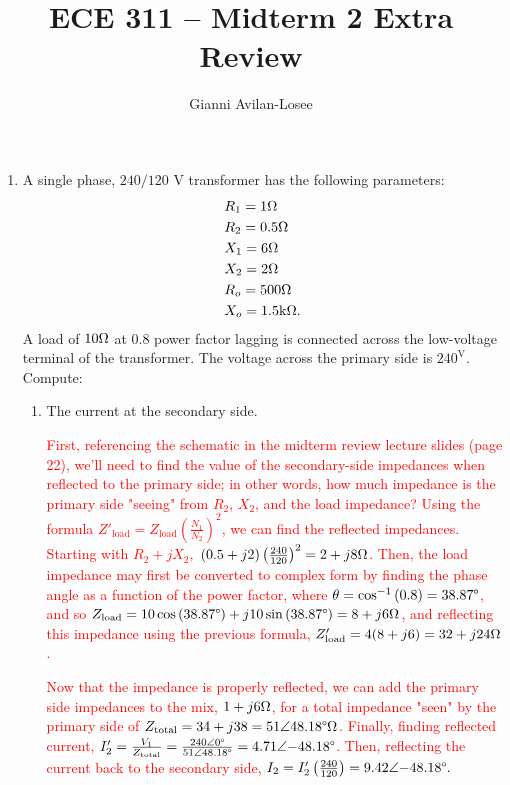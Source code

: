 \documentclass{article}
\title{ECE 311 -- Midterm 2 Extra Review}
\author{Gianni Avilan-Losee}
\begin{document}
\begin{enumerate}[label=\thesubsection]
	\setcounter{section}{11}
	\setcounter{subsection}{1}
	\item A single phase, \(240/120\) V transformer has the following parameters:
		\begin{align*}
		 &R_1 = 1\ohm \\
		 &R_2 = 0.5\ohm \\
		 &X_1 = 6\ohm \\
		 &X_2 = 2\ohm \\
		 &R_o = 500\ohm \\
		 &X_o = 1.5 \mathrm{k}\ohm.
		\end{align*}
		A load of \(10\ohm\) at 0.8 power factor lagging is connected across the low-voltage terminal of the transformer. The voltage across the primary side is \(240^{\mathrm{V}}\). Compute:
		\begin{enumerate}[label=\alph*)]
			\item The current at the secondary side.

				\textcolor{red}{First, referencing the schematic in the midterm review lecture slides (page 22), we'll need to find the value of the secondary-side impedances when reflected to the primary side; in other words, how much impedance is the primary side "seeing" from \(R_2\), \(X_2\), and the load impedance? Using the formula \(Z'_{\mathrm{load}} = Z_{\mathrm{load}}\left(\frac{N_1}{N_2}\right)^2\), we can find the reflected impedances. Starting with \(R_2 + jX_2,\) \((0.5+j2)\left(\frac{240}{120}\right)^2 = 2+j8\ohm\). Then, the load impedance may first be converted to complex form by finding the phase angle as a function of the power factor, where \(\theta = \cos^{-1}{(0.8)} = 38.87\degree\), and so \(Z_{\mathrm{load}} = 10\cos{(38.87\degree)} + j10\sin{(38.87\degree)} = 8 + j6 \ohm\), and reflecting this impedance using the previous formula, \(Z'_{\mathrm{load}} = 4(8+j6) = 32 + j24\ohm\).}

			\textcolor{red}{Now that the impedance is properly reflected, we can add the primary side impedances to the mix, \(1 + j6\ohm\), for a total impedance "seen" by the primary side of \(Z_{\mathrm{total}} = 34 + j38 = 51\angle{48.18\degree} \ohm\). Finally, finding reflected current, \(I'_2 = \frac{V_1}{Z_{\mathrm{total}}} = \frac{240\angle{0\degree}}{51\angle{48.18\degree}} = 4.71\angle{-48.18\degree}\). Then, reflecting the current back to the secondary side, \(I_2 = I'_2 \left(\frac{240}{120}\right) = 9.42\angle{-48.18\degree}.\)}


\end{enumerate}
\end{enumerate}
\end{document}
